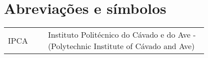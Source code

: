 \chapter*{Abreviações e símbolos}

\begin{flushleft}
\begin{tabular}{l p{0.8\linewidth}}
    IPCA      & Instituto Politécnico do Cávado e do Ave - (Polytechnic Institute of Cávado and Ave)\\
\end{tabular}
\end{flushleft}

